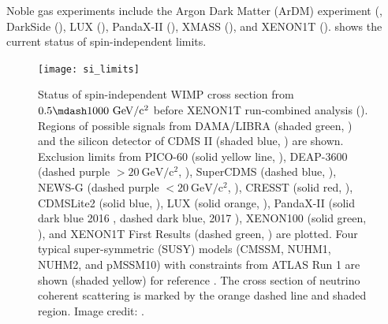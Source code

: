 Noble gas experiments include the Argon Dark Matter (ArDM) experiment (, DarkSide
(), LUX (),
PandaX-II (), XMASS (), and XENON1T ().   shows the
current status of spin-independent limits.

\begin{figure}
\centering
\texttt{[image: si\_limits]}
\caption{Status of spin-independent WIMP cross section from $0.5 \mdash 1000\ \mathrm{GeV/c^2}$ before XENON1T run-combined analysis
().  Regions of possible signals from DAMA/LIBRA (shaded green, ) and the silicon
detector of CDMS II (shaded blue, ) are shown.  Exclusion limits from PICO-60 (solid yellow line, ),
DEAP-3600 (dashed purple $> 20\ \mathrm{GeV/c^2}$,
), SuperCDMS (dashed blue, ), NEWS-G (dashed purple $< 20\ \mathrm{GeV/c^2}$,
), CRESST (solid red, ), CDMSLite2 (solid blue, ), LUX
(solid orange, ), PandaX-II (solid dark blue 2016
, dashed dark blue, 2017 ), XENON100 (solid green, ), and
XENON1T First Results (dashed green, ) are plotted.  Four typical super-symmetric (SUSY) models (CMSSM, NUHM1, NUHM2,
and pMSSM10) with constraints from ATLAS Run
1 are shown (shaded yellow) for reference .  The cross section of neutrino coherent scattering is marked by the
orange dashed
line and shaded region.  Image credit: .}
\label{fig:si_limits}
\end{figure}


